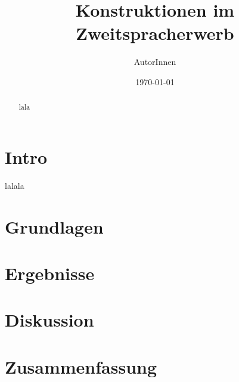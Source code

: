 \documentclass{scrartcl}
\title{Konstruktionen im Zweitspracherwerb}
\author{AutorInnen}
\date{\today}
\begin{document}
\maketitle

\begin{abstract}
    lala
\end{abstract}

\tableofcontents

\section{Intro}
lalala \cite{scikit-learn}

\section{Grundlagen}

\section{Ergebnisse}

\section{Diskussion}

\section{Zusammenfassung}

\nocite{*}



\end{document}
